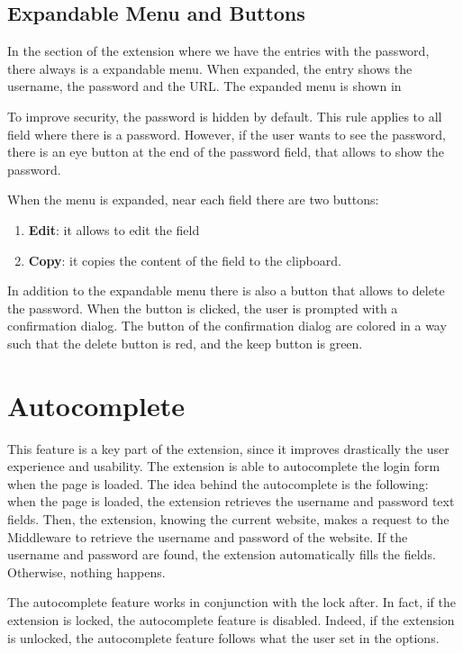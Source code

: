 
\subsection{Expandable Menu and Buttons}

In the section of the extension where we have the entries with the password, there always is a expandable menu. When expanded, the entry shows the username, the password and the URL. The expanded menu is shown in %

To improve security, the password is hidden by default. This rule applies to all field where there is a password. However, if the user wants to see the password, there is an eye button at the end of the password field, that allows to show the password.

When the menu is expanded, near each field there are two buttons:

\begin{enumerate}
    \item \textbf{Edit}: it allows to edit the field
    \item \textbf{Copy}: it copies the content of the field to the clipboard.
\end{enumerate}

In addition to the expandable menu there is also a button that allows to delete the password. When the button is clicked, the user is prompted with a confirmation dialog. The button of the confirmation dialog are colored in a way such that the delete button is red, and the keep button is green.


\section{Autocomplete}

This feature is a key part of the extension, since it improves drastically the user experience and usability. The extension is able to autocomplete the login form when the page is loaded. 
The idea behind the autocomplete is the following: when the page is loaded, the extension retrieves the username and password text fields. Then, the extension, knowing the current website, makes a request to the Middleware to retrieve the username and password of the website. If the username and password are found, the extension automatically fills the fields. Otherwise, nothing happens.

The autocomplete feature works in conjunction with the lock after. In fact, if the extension is locked, the autocomplete feature is disabled. Indeed, if the extension is unlocked, the autocomplete feature follows what the user set in the options.
